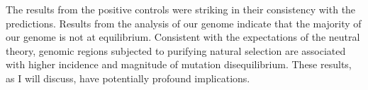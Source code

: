 The results from the positive controls were striking in their consistency with the predictions. Results from the analysis of our genome indicate that the majority of our genome is not at equilibrium. Consistent with the expectations of the neutral theory, genomic regions subjected to purifying natural selection are associated with higher incidence and magnitude of mutation disequilibrium. These results, as I will discuss, have potentially profound implications. 